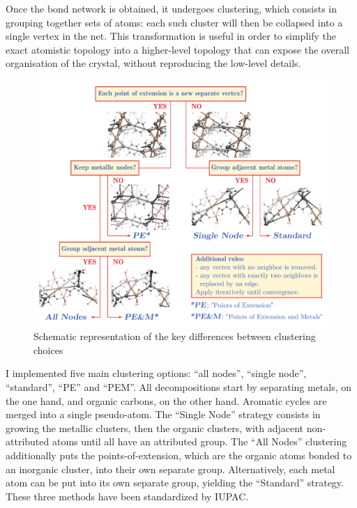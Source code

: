 \documentclass[main.tex]{subfiles}
\begin{document}
Once the bond network is obtained, it undergoes clustering, which consists in grouping together sets of atoms: each such cluster will then be collapsed into a single vertex in the net. This transformation is useful in order to simplify the exact atomistic topology into a higher-level topology that can expose the overall organisation of the crystal, without reproducing the low-level details. %

\begin{figure}
	\centering
	\includegraphics[width=\linewidth]{figures/topology/clustering.pdf}

	\caption{Schematic representation of the key differences between clustering choices}\label{fig:clustering}
\end{figure}

I implemented five main clustering options: ``all nodes'', ``single node'', ``standard'', ``PE'' and ``PEM''. All decompositions start by separating metals, on the one hand, and organic carbons, on the other hand. Aromatic cycles are merged into a single pseudo-atom. The ``Single Node'' strategy\autocite{IUPAC_SBU} consists in growing the metallic clusters, then the organic clusters, with adjacent non-attributed atoms until all have an attributed group. The ``All Nodes'' clustering\autocite{IUPAC_SBU} additionally puts the points-of-extension\autocite{UnifiedTopology,YaghiRodMOFs}, which are the organic atoms bonded to an inorganic cluster, into their own separate group. Alternatively, each metal atom can be put into its own separate group, yielding the ``Standard'' strategy. These three methods have been standardized by IUPAC\autocite{IUPAC_SBU}.
\end{document}
